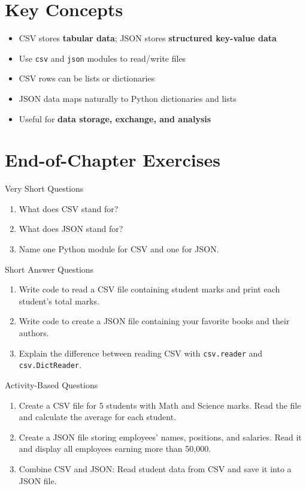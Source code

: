 \section{Key Concepts}

\begin{itemize}
    \item CSV stores \textbf{tabular data}; JSON stores \textbf{structured key-value data}  
    \item Use \texttt{csv} and \texttt{json} modules to read/write files  
    \item CSV rows can be lists or dictionaries  
    \item JSON data maps naturally to Python dictionaries and lists  
    \item Useful for \textbf{data storage, exchange, and analysis}  
\end{itemize}

\section{End-of-Chapter Exercises}

\begin{exercise}{Very Short Questions}
\begin{enumerate}
    \item What does CSV stand for?  
    \item What does JSON stand for?  
    \item Name one Python module for CSV and one for JSON.  
\end{enumerate}
\end{exercise}

\begin{exercise}{Short Answer Questions}
\begin{enumerate}
    \item Write code to read a CSV file containing student marks and print each student’s total marks.  
    \item Write code to create a JSON file containing your favorite books and their authors.  
    \item Explain the difference between reading CSV with \texttt{csv.reader} and \texttt{csv.DictReader}.  
\end{enumerate}
\end{exercise}

\begin{exercise}{Activity-Based Questions}
\begin{enumerate}
    \item Create a CSV file for 5 students with Math and Science marks. Read the file and calculate the average for each student.  
    \item Create a JSON file storing employees’ names, positions, and salaries. Read it and display all employees earning more than 50,000.  
    \item Combine CSV and JSON: Read student data from CSV and save it into a JSON file.  
\end{enumerate}
\end{exercise}

